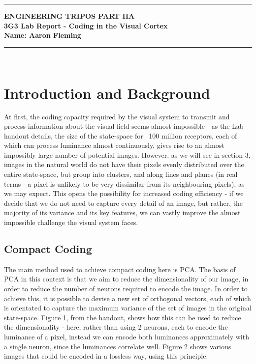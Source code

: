 \documentclass[12pt]{article}
\begin{document}
\noindent
\rule{15.7cm}{0.5mm}


\begin{center}
{\bf ENGINEERING TRIPOS PART IIA}\\
\vspace{0.5cm} {\bf 3G3 Lab Report - Coding in the Visual Cortex}\\
\vspace{0.5cm}
{\bf Name: Aaron Fleming}\\
\end{center}
\rule{15.7cm}{0.5mm}

\hfill\\

\section{Introduction and Background}
At first, the coding capacity required by the visual system to transmit and process information about the visual field seems almost impossible - as the Lab handout details, the size of the state-space for ~100 million receptors, each of which can process luminance almost continuously, gives rise to an almost impossibly large number of potential images. However, as we will see in section 3, images in the natural world do not have their pixels evenly distributed over the entire state-space, but group into clusters, and along lines and planes (in real terms - a pixel is unlikely to be very dissimilar from its neighbouring pixels), as we may expect. This opens the possibility for increased coding efficiency - if we decide that we do not need to capture every detail of an image, but rather, the majority of its variance and its key features, we can vastly improve the almost impossible challenge the visual system faces.\\

\subsection{Compact Coding}
The main method used to achieve compact coding here is PCA. The basis of PCA in this context is that we aim to reduce the dimensionality of our image, in order to reduce the number of neurons required to encode the image. In order to achieve this, it is possible to devise a new set of orthogonal vectors, each of which is orientated to capture the maximum variance of the set of images in the original state-space. Figure 1, from the handout, shows how this can be used to reduce the dimensionality - here, rather than using 2 neurons, each to encode the luminance of a pixel, instead we can encode both luminances approximately with a single neuron, since the luminances correlate well. Figure 2 shows various images that could be encoded in a lossless way, using this principle.
\end{document}
